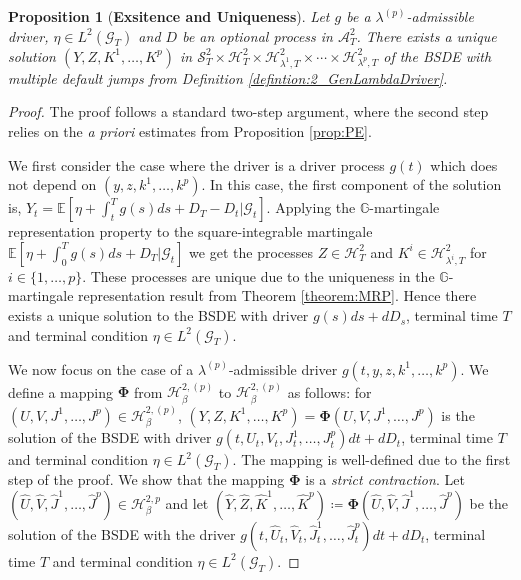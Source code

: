 \documentclass[11pt,a4paper]{article}
\numberwithin{equation}{section}
\theoremstyle{newPlain}
\newtheorem{proposition}[theorem]{Proposition}
\theoremstyle{newDefinition}
\theoremstyle{newRemark}
\begin{document}
{\begin{proposition}[\textbf{Exsitence and Uniqueness}]\label{prop:EU}
    Let $g$ be a $\lambda^{(p)}$-admissible driver, $\eta\in L^2(\mathcal{G}_T)$ and $D$ be an optional process in $\mathcal{A}_T^2$. There exists a unique solution $(Y,Z,K^1,\ldots,K^p)$ in $\mathcal{S}_T^2\times\mathcal{H}_T^2\times\mathcal{H}_{\lambda^1,T}^2\times\cdots\times\mathcal{H}_{\lambda^p,T}^2$ of the BSDE with multiple default jumps from Definition \ref{defintion:2_GenLambdaDriver}.
\end{proposition}
\begin{proof}
	The proof follows a standard two-step argument, where the second step relies on the \emph{a priori} estimates from Proposition \ref{prop:PE}.
	
	 We first consider the case where the driver is a driver process $g(t)$ which does not depend on $(y,z,k^1,\ldots,k^p)$. In this case,  the first component of the solution is, $Y_t = \mathbb{E}[\eta + \int_t^Tg(s)ds + D_T - D_t|\mathcal{G}_t]$. Applying the $\mathbb{G}$-martingale representation property to the square-integrable martingale $\mathbb{E}[\eta + \int_0^Tg(s)ds + D_T|\mathcal{G}_t]$ we get the processes $Z\in\mathcal{H}_T^2$ and $K^i\in\mathcal{H}_{\lambda^i,T}^2$ for $i\in\{1,\ldots,p\}$. These processes are unique due to the uniqueness in the $\mathbb{G}$-martingale representation result from Theorem \ref{theorem:MRP}. Hence there exists a unique solution to the BSDE with driver $g(s)ds + dD_s$, terminal time $T$ and terminal condition $\eta\in L^2(\mathcal{G}_T)$.
    
    We now focus on the case of a $\lambda^{(p)}$-admissible driver $g(t,y,z,k^1,\ldots,k^p)$.  We define a mapping $\mathbf{\Phi}$ from $\mathcal{H}_\beta^{2,(p)}$ to $\mathcal{H}_\beta^{2,(p)}$ as follows: for $(U,V,J^1,\ldots,J^p)\in\mathcal{H}_\beta^{2,(p)}$, $(Y,Z,K^1,\ldots,K^p)=\mathbf{\Phi}(U,V,J^1,\ldots,J^p)$ is the solution of the BSDE with driver $g(t,U_t,V_t,J_t^1,\ldots,J_t^p)dt + dD_t$, terminal time $T$ and terminal condition $\eta\in L^2(\mathcal{G}_T)$.
    The mapping is well-defined due to the first step of the proof.
    We  show that the mapping $\mathbf{\Phi}$ is a \textit{strict contraction}.  Let $(\hat{U},\hat{V},\hat{J}^1,\ldots,\hat{J}^p)\in\mathcal{H}_\beta^{2,p}$ and let $(\hat{Y},\hat{Z},\hat{K}^1,\ldots,\hat{K}^p)\coloneqq\mathbf{\Phi}(\hat{U},\hat{V},\hat{J}^1,\ldots,\hat{J}^p)$ be the solution of the BSDE with the driver $g(t,\hat{U}_t,\hat{V}_t,\hat{J}_t^1,\ldots,\hat{J}_t^p)dt + dD_t$, terminal time $T$ and terminal condition $\eta\in L^2(\mathcal{G}_T)$.


\end{proof}}
\end{document}
